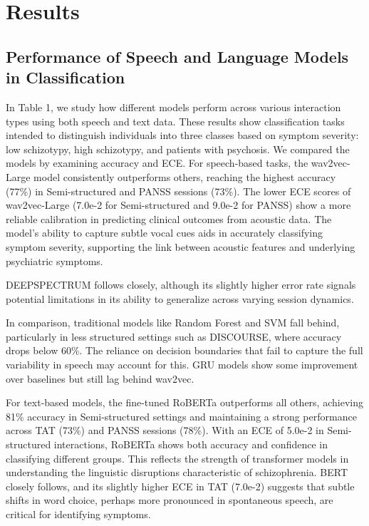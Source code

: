 \documentclass[9pt,a4paper]{rho-class/rho}
\begin{document}
\section{Results}
\subsection{Performance of Speech and Language Models in Classification}
In Table 1, we study how different models perform across various interaction types using both speech and text data. These results show classification tasks intended to distinguish individuals into three classes based on symptom severity: low schizotypy, high schizotypy, and patients with psychosis. We compared the models by examining accuracy and ECE. For speech-based tasks, the wav2vec-Large model consistently outperforms others, reaching the highest accuracy (77\%) in Semi-structured and PANSS sessions (73\%). The lower ECE scores of wav2vec-Large (7.0e-2 for Semi-structured and 9.0e-2 for PANSS) show a more reliable calibration in predicting clinical outcomes from acoustic data. 
The model’s ability to capture subtle vocal cues aids in accurately classifying symptom severity, supporting the link between acoustic features and underlying psychiatric symptoms.

DEEPSPECTRUM follows closely, although its slightly higher error rate signals potential limitations in its ability to generalize across varying session dynamics. 

In comparison, traditional models like Random Forest and SVM fall behind, particularly in less structured settings such as DISCOURSE, where accuracy drops below 60\%. The reliance on decision boundaries that fail to capture the full variability in speech may account for this. GRU models show some improvement over baselines but still lag behind wav2vec.

For text-based models, the fine-tuned RoBERTa outperforms all others, achieving 81\% accuracy in Semi-structured settings and maintaining a strong performance across TAT (73\%) and PANSS sessions (78\%). With an ECE of 5.0e-2 in Semi-structured interactions, RoBERTa shows both accuracy and confidence in classifying different groups. This reflects the strength of transformer models in understanding the linguistic disruptions characteristic of schizophrenia. BERT closely follows, and its slightly higher ECE in TAT (7.0e-2) suggests that subtle shifts in word choice, perhaps more pronounced in spontaneous speech, are critical for identifying symptoms.
\end{document}
